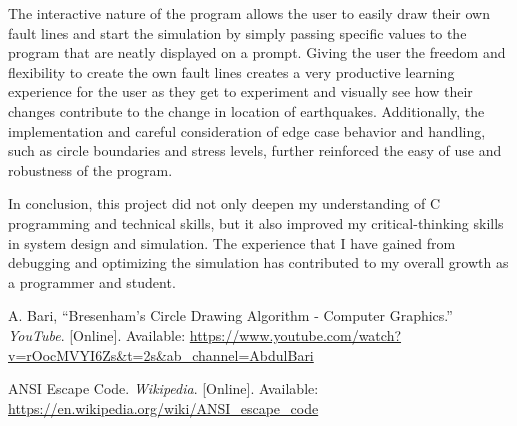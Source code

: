 \documentclass[conference]{IEEEtran}
\begin{document}
The interactive nature of the program allows the user to easily draw their own fault lines and start the simulation by simply passing specific values to the program that are neatly displayed on a prompt. Giving the user the freedom and flexibility to create the own fault lines creates a very productive learning experience for the user as they get to experiment and visually see how their changes contribute to the change in location of earthquakes. Additionally, the implementation and careful consideration of edge case behavior and handling, such as circle boundaries and stress levels, further reinforced the easy of use and robustness of the program. 

In conclusion, this project did not only deepen my understanding of C programming and technical skills, but it also improved my critical-thinking skills in system design and simulation. The experience that I have gained from debugging and optimizing the simulation has contributed to my overall growth as a programmer and student.

\newpage

\begin{thebibliography}{1}

A. Bari, “Bresenham's Circle Drawing Algorithm - Computer Graphics.” \textit{YouTube}. [Online]. Available: \url{https://www.youtube.com/watch?v=rOocMVYI6Zs&t=2s&ab_channel=AbdulBari}

ANSI Escape Code. \textit{Wikipedia}. [Online]. Available: \url{https://en.wikipedia.org/wiki/ANSI_escape_code}

\end{thebibliography}
\end{document}
